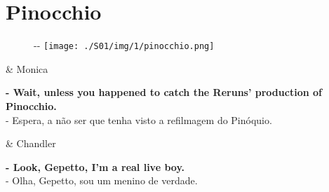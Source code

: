\hypertarget{pinocchio}{%
\section{Pinocchio}\label{pinocchio}}

\begin{figure}[!ht]
  \begin{adjustwidth}{-\oddsidemargin-1in}{-\rightmargin}
    \centering
    \texttt{[image: ./S01/img/1/pinocchio.png]}
  \end{adjustwidth}
\end{figure}

\begin{tcolorbox}[enhanced,center upper,
    drop fuzzy shadow southeast, boxrule=0.3pt,
    lower separated=false, breakable,
    colframe=black!30!dialogoBorder,colback=white]
\begin{minipage}[c]{0.16\linewidth}
   & \centering \scriptsize{Monica}
\end{minipage}
\hfill
\begin{minipage}[c]{0.8\linewidth}
  \textbf{- Wait, unless you happened to catch the Reruns' production of Pinocchio.}\\
  - Espera, a não ser que tenha visto a refilmagem do Pinóquio.
\end{minipage}

\medskip
\begin{minipage}[c]{0.16\linewidth}
   & \centering \scriptsize{Chandler}
\end{minipage}
\hfill
\begin{minipage}[c]{0.8\linewidth}
  \textbf{- Look, Gepetto, I'm a real live boy.}\\
  - Olha, Gepetto, sou um menino de verdade.
\end{minipage}
\end{tcolorbox}

